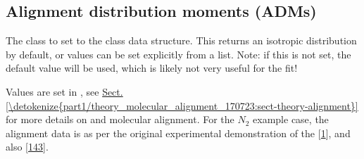 \documentclass[letterpaper,table,10pt,english]{jupyterBook}
\begin{document}
\subsection{Alignment distribution moments (ADMs)}
\label{\detokenize{part2/basic_fitting_numerics_intro_260723:alignment-distribution-moments-adms}}
\sphinxAtStartPar
The class  to set {\hyperref[\detokenize{backmatter/glossary:term-ADMs}]{}} to the class data structure. This returns an isotropic distribution by default, or values can be set explicitly from a list. Note: if this is not set, the default value will be used, which is likely not very useful for the fit!

\sphinxAtStartPar
Values are set in , see \hyperref[\detokenize{part1/theory_molecular_alignment_170723:sect-theory-alignment}]{Sect.\@ \ref{\detokenize{part1/theory_molecular_alignment_170723:sect-theory-alignment}}} for more details on {\hyperref[\detokenize{backmatter/glossary:term-ADMs}]{}} and molecular alignment. For the \(N_2\) example case, the alignment data is as per the original experimental demonstration of the {\hyperref[\detokenize{backmatter/glossary:term-bootstrap-retrieval-protocol}]{}} {[}\hyperlink{cite.backmatter/bibliography:id775}{1}{]}, and also  {[}\hyperlink{cite.backmatter/bibliography:id672}{143}{]}.
\end{document}
